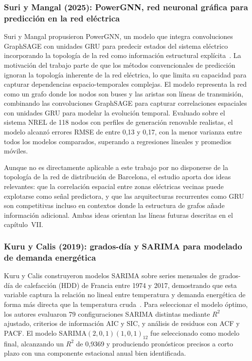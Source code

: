 \documentclass[12pt, a4paper]{article}
\begin{document}
\subsubsection{Suri y Mangal (2025): PowerGNN, red neuronal gráfica para predicción en la red eléctrica}

Suri y Mangal propusieron PowerGNN, un modelo que integra convoluciones GraphSAGE con unidades GRU para predecir estados del sistema eléctrico incorporando la topología de la red como información estructural explícita~\cite{suri2025}. La motivación del trabajo parte de que los métodos convencionales de predicción ignoran la topología inherente de la red eléctrica, lo que limita su capacidad para capturar dependencias espacio-temporales complejas. El modelo representa la red como un grafo donde los nodos son buses y las aristas son líneas de transmisión, combinando las convoluciones GraphSAGE para capturar correlaciones espaciales con unidades GRU para modelar la evolución temporal. Evaluado sobre el sistema NREL de 118 nodos con perfiles de generación renovable realistas, el modelo alcanzó errores RMSE de entre 0,13 y 0,17, con la menor varianza entre todos los modelos comparados, superando a regresiones lineales y promedios móviles.

Aunque no es directamente aplicable a este trabajo por no disponerse de la topología de la red de distribución de Barcelona, el estudio aporta dos ideas relevantes: que la correlación espacial entre zonas eléctricas vecinas puede explotarse como señal predictora, y que las arquitecturas recurrentes como GRU son competitivas incluso en contextos donde la estructura de grafos añade información adicional. Ambas ideas orientan las líneas futuras descritas en el capítulo~VII.

\subsubsection{Kuru y Calis (2019): grados-día y SARIMA para modelado de demanda energética}

Kuru y Calis construyeron modelos SARIMA sobre series mensuales de grados-día de calefacción (HDD) de Francia entre 1974 y 2017, demostrando que esta variable captura la relación no lineal entre temperatura y demanda energética de forma más directa que la temperatura cruda~\cite{kuru2019}. Para seleccionar el modelo óptimo, los autores evaluaron 79 configuraciones SARIMA distintas mediante $R^2$ ajustado, criterios de información AIC y SIC, y análisis de residuos con ACF y PACF. El modelo SARIMA$(2,0,1)(1,0,1)_{12}$ fue seleccionado como modelo final, alcanzando un $R^2$ de 0,9369 y produciendo pronósticos precisos a corto plazo con una componente estacional anual bien identificada.
\end{document}
